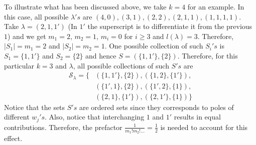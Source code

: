 To illustrate what has been discussed above, we take $k = 4$ for an example. In this case, all possible $\lambda 's$ are $(4,0), (3,1), (2,2), (2,1,1), (1,1,1,1)$. Take $\lambda = (2,1,1')$ (In $1'$ the superscript is to differentiate it from the previous $1$) and we get $m_1 = 2$, $m_2 = 1$, $m_i = 0$ for $i \ge 3$ and $l(\lambda) = 3$. Therefore, $|S_1| = m_1 = 2$ and $|S_2| = m_2 = 1$. One possible collection of such $S_i's$ is $S_1 = \{1,1'\}$ and $S_2 = \{2\}$ and hence $S = (\{1,1'\},  \{2\})$. Therefore, for this particular $k = 3$ and $\lambda$, all possible collections of such $S's$ are 
\begin{align}
\mathcal{S}_{\lambda} = \{ &(\{1,1'\},\{2\}), (\{1,2\},\{1'\}), \\ 
													 &(\{1',1\},\{2\}), (\{1', 2\},\{1\}),\\
													 &(\{2,1\},\{1'\}), (\{2,1'\},\{1\})\}
\end{align}
Notice that the sets $S's$ are ordered sets since they corresponds to poles of different $w_j's$. Also, notice that interchanging $1$ and $1'$ results in equal contributions. Therefore, the prefactor $\frac{1}{m_1! m_2! \dots} = \frac{1}{2}$ is needed to account for this effect.

